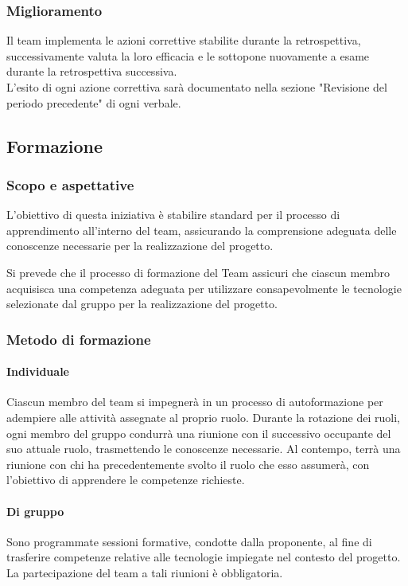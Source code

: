 \documentclass{article}
\begin{document}
 \subsubsection{Miglioramento}
 Il team implementa le azioni correttive stabilite durante la retrospettiva, successivamente valuta la loro efficacia e le sottopone nuovamente a esame durante la retrospettiva successiva.\\
L'esito di ogni azione correttiva sarà documentato nella sezione "Revisione del periodo precedente" di ogni verbale.

\subsection{Formazione}
\subsubsection{Scopo e aspettative}
L'obiettivo di questa iniziativa è stabilire standard per il processo di apprendimento all'interno del team, assicurando la comprensione adeguata delle conoscenze necessarie per la realizzazione del progetto.

\vspace*{0.1cm}


Si prevede che il processo di formazione del Team assicuri che ciascun membro acquisisca una competenza adeguata per utilizzare consapevolmente le tecnologie selezionate dal gruppo per la realizzazione del progetto.

\subsubsection{Metodo di formazione}
\paragraph{Individuale}
Ciascun membro del team si impegnerà in un processo di autoformazione per adempiere alle attività assegnate al proprio ruolo. Durante la rotazione dei ruoli, ogni membro del gruppo condurrà una riunione con il successivo occupante del suo attuale ruolo, trasmettendo le conoscenze necessarie. Al contempo, terrà una riunione con chi ha precedentemente svolto il ruolo che esso assumerà, con l'obiettivo di apprendere le competenze richieste.

\paragraph{Di gruppo}
Sono programmate sessioni formative, condotte dalla proponente, al fine di trasferire competenze relative alle tecnologie impiegate nel contesto del progetto. La partecipazione del team a tali riunioni è obbligatoria.
\end{document}
